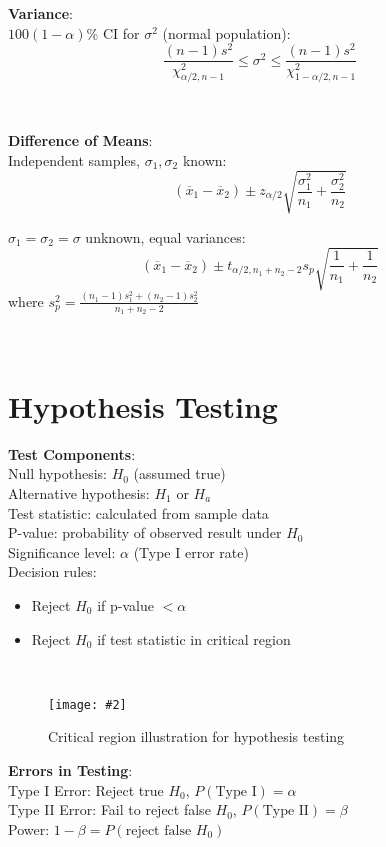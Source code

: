 \documentclass{article}
\def\imagewidth{0.9}
\newenvironment{cheatformula}[1][Title]{
    \begin{minipage}{\linewidth}
    \textbf{#1}:\\
}{
    \end{minipage}\\[2ex]
}
\newcommand{\cheatimage}[4][\imagewidth]{
    \begin{figure}[H]
        \centering
        \texttt{[image: \#2]}
        \caption{#3}
        \label{#4}
    \end{figure}
}
\begin{document}
\begin{multicols*}{2}
\begin{cheatformula}[Variance]
    $100(1-\alpha)\%$ CI for $\sigma^2$ (normal population):
    $$\frac{(n-1)s^2}{\chi^2_{\alpha/2,n-1}} \leq \sigma^2 \leq \frac{(n-1)s^2}{\chi^2_{1-\alpha/2,n-1}}$$
\end{cheatformula}

\begin{cheatformula}[Difference of Means]
    Independent samples, $\sigma_1, \sigma_2$ known:
    $$(\overline{x}_1 - \overline{x}_2) \pm z_{\alpha/2}\sqrt{\frac{\sigma_1^2}{n_1} + \frac{\sigma_2^2}{n_2}}$$
    
    $\sigma_1 = \sigma_2 = \sigma$ unknown, equal variances:
    $$(\overline{x}_1 - \overline{x}_2) \pm t_{\alpha/2,n_1+n_2-2}s_p\sqrt{\frac{1}{n_1} + \frac{1}{n_2}}$$
    where $s_p^2 = \frac{(n_1-1)s_1^2 + (n_2-1)s_2^2}{n_1+n_2-2}$
\end{cheatformula}

\section{Hypothesis Testing}

\begin{cheatformula}[Test Components]
    Null hypothesis: $H_0$ (assumed true)\\
    Alternative hypothesis: $H_1$ or $H_a$\\
    Test statistic: calculated from sample data\\
    P-value: probability of observed result under $H_0$\\
    Significance level: $\alpha$ (Type I error rate)\\
    
    Decision rules:
    \begin{itemize}
        \item Reject $H_0$ if p-value $< \alpha$
        \item Reject $H_0$ if test statistic in critical region
    \end{itemize}
\end{cheatformula}

\cheatimage[1.0]{critical_region.png}{Critical region illustration for hypothesis testing}{fig:critical-region}

\begin{cheatformula}[Errors in Testing]
    Type I Error: Reject true $H_0$, $P(\text{Type I}) = \alpha$\\
    Type II Error: Fail to reject false $H_0$, $P(\text{Type II}) = \beta$\\
    Power: $1 - \beta = P(\text{reject false } H_0)$\\
    

\end{cheatformula}
\end{multicols*}
\end{document}
